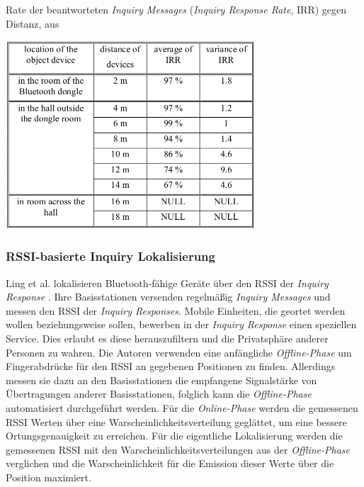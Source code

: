 \begin{table}[h]
  \centering
  \caption{Rate der beantworteten \emph{Inquiry Messages} (\emph{Inquiry Response Rate}, IRR) gegen Distanz, aus \cite{bargh2008indoor}}
	\includegraphics[width=0.7\textwidth]{images/irr.png}

  \label{table:irr}
\end{table}

\subsubsection{RSSI-basierte Inquiry Lokalisierung}
\label{ch:Vorherige:sec:inq}
Ling et al. lokalisieren Bluetooth-fähige Geräte über den RSSI der \emph{Inquiry Response} \cite{ling2010inquiry}.
Ihre Basisstationen versenden regelmäßig \emph{Inquiry Messages} und messen den RSSI der \emph{Inquiry Responses}.
Mobile Einheiten, die geortet werden wollen beziehungsweise sollen, bewerben in der \emph{Inquiry Response} einen speziellen Service.
Dies erlaubt es diese herauszufiltern und die Privatsphäre anderer Personen zu wahren.
Die Autoren verwenden eine anfängliche \emph{Offline-Phase} um Fingerabdrücke für den RSSI an gegebenen Positionen zu finden.
Allerdings messen sie dazu an den Basisstationen die empfangene Signalstärke von Übertragungen anderer Basisstationen, folglich kann die \emph{Offline-Phase} automatisiert durchgeführt werden.
Für die \emph{Online-Phase} werden die gemessenen RSSI Werten über eine Warscheinlichkeitsverteilung geglättet, um eine bessere Ortungsgenauigkeit zu erreichen.
Für die eigentliche Lokalisierung werden die gemessenen RSSI mit den Warscheinlichkeitsverteilungen aus der \emph{Offline-Phase} verglichen und die Warscheinlichkeit für die Emission dieser Werte über die Position maximiert.

